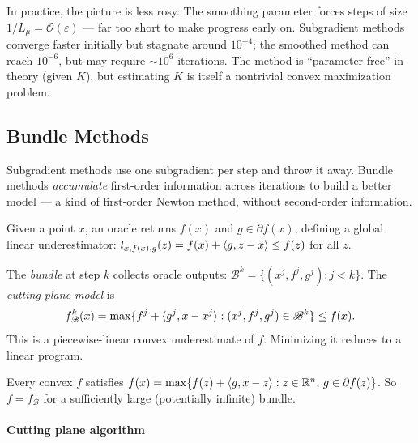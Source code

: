 In practice, the picture is less rosy.
The smoothing parameter forces steps of size $1/L_\mu = \mathcal{O}(\varepsilon)$ --- far too short to make progress early on.
Subgradient methods converge faster initially but stagnate around $10^{-4}$; the smoothed method can reach $10^{-6}$, but may require $\sim\!10^6$ iterations.
The method is ``parameter-free'' in theory (given $K$), but estimating $K$ is itself a nontrivial convex maximization problem.


\subsection{Bundle Methods}\label{ssec:bundle-methods}

Subgradient methods use one subgradient per step and throw it away.
Bundle methods \emph{accumulate} first-order information across iterations to build a better model --- a kind of first-order Newton method, without second-order information.

Given a point $x$, an oracle returns $f(x)$ and $g \in \partial f(x)$, defining a global linear underestimator:
$l_{x, f(x), g}(z) = f(x) + \langle g, z - x\rangle \leq f(z)$ for all $z$.

\begin{defn}\label{def:bundle}
	The \textit{bundle} at step $k$ collects oracle outputs: $\mathcal{B}^k = \{(x^j, f^j, g^j) : j < k\}$.
	The \textit{cutting plane model} is
	\begin{equation}\label{eq:cutting-plane}
		f_{\mathcal{B}}^k(x) = \max\{f^j + \langle g^j, x - x^j\rangle : (x^j, f^j, g^j) \in \mathcal{B}^k\} \leq f(x).
	\end{equation}
	This is a piecewise-linear convex underestimate of $f$.
	Minimizing it reduces to a linear program.
\end{defn}

\begin{thm}\label{thm:convex-max-affine}
	Every convex $f$ satisfies $f(x) = \max\{f(z) + \langle g, x - z\rangle : z \in \mathbb{R}^n,\, g \in \partial f(z)\}$.
	So $f = f_{\mathcal{B}}$ for a sufficiently large (potentially infinite) bundle.
\end{thm}

\paragraph{Cutting plane algorithm}

